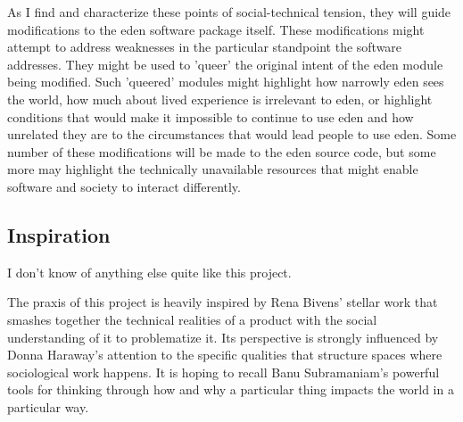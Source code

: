 \documentclass[a4paper,man,natbib]{apa6}
\begin{document}
   As I find and characterize these points of social-technical tension, they will guide modifications to the \acrshort{eden} software package itself. These modifications might attempt to address weaknesses in the particular standpoint the software addresses. They might be used to 'queer' the original intent of the \acrshort{eden} module being modified. Such 'queered' modules might highlight how narrowly \acrshort{eden} sees the world, how much about lived experience is irrelevant to \acrshort{eden}, or highlight conditions that would make it impossible to continue to use \acrshort{eden} and how unrelated they are to the circumstances that would lead people to use \acrshort{eden}. Some number of these modifications will be made to the \acrshort{eden} source code, but some more may highlight the technically unavailable resources that might enable software and society to interact differently.

   \subsection*{Inspiration}
   I don't know of anything else quite like this project.

   The praxis of this project is heavily inspired by Rena Bivens' stellar work that smashes together the technical realities of a product with the social understanding of it to problematize it. Its perspective is strongly influenced by Donna Haraway's attention to the specific qualities  that structure spaces where sociological work happens. It is hoping to recall Banu Subramaniam's powerful tools for thinking through how and why a particular thing impacts the world in a particular way.
   
\end{document}
